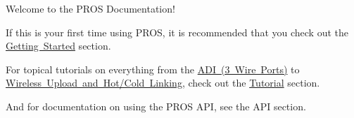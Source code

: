 Welcome to the P\+R\+OS Documentation!

If this is your first time using P\+R\+OS, it is recommended that you check out the \mbox{\hyperlink{md_docs_getting-started_index}{Getting Started}} section.

For topical tutorials on everything from the \mbox{\hyperlink{md_docs_tutorials_topical_adi}{A\+DI (3 Wire Ports)}} to \mbox{\hyperlink{md_docs_tutorials_topical_wireless-upload}{Wireless Upload and Hot/\+Cold Linking}}, check out the \mbox{\hyperlink{md_docs_tutorials_index}{Tutorial}} section.

And for documentation on using the P\+R\+OS A\+PI, see the A\+PI section. 